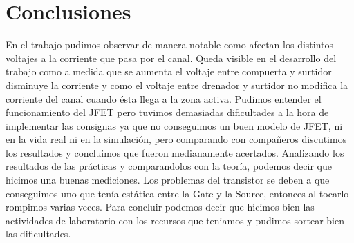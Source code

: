 \newpage
\section{Conclusiones}\sangria{}En el trabajo pudimos observar de manera notable como afectan los distintos voltajes a la corriente que pasa por el canal. Queda visible en el desarrollo del trabajo como a medida que se aumenta el voltaje entre compuerta y surtidor disminuye la corriente y como el voltaje entre drenador y surtidor no modifica la corriente del canal cuando ésta llega a la zona activa. Pudimos entender el funcionamiento del JFET pero tuvimos demasiadas dificultades a la hora de implementar las consignas ya que no conseguimos un buen modelo de JFET, ni en la vida real ni en la simulación, pero comparando con compañeros discutimos los resultados y concluimos que fueron medianamente acertados.
\sangria{}Analizando los resultados de las prácticas y comparandolos con la teoría, podemos decir que hicimos una buenas mediciones.
\sangria{}Los problemas del transistor se deben a que conseguimos uno que tenía estática entre la Gate y la Source, entonces al tocarlo rompimos varias veces.
\sangria{}Para concluir podemos decir que hicimos bien las actividades de laboratorio con los recursos que teniamos y pudimos sortear bien las dificultades.
